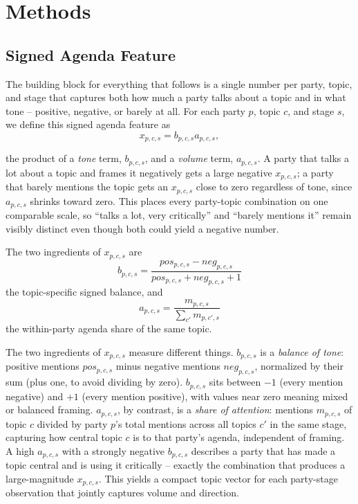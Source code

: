 \documentclass[conference]{IEEEtran}
\begin{document}
\FloatBarrier

\smallskip
\section{Methods}
\subsection{Signed Agenda Feature}
The building block for everything that follows is a single number per party, topic, and stage that captures both how much a party talks about a topic and in what tone -- positive, negative, or barely at all. For each party $p$, topic $c$, and stage $s$, we define this signed agenda feature as
\begin{equation}
x_{p,c,s} = b_{p,c,s} a_{p,c,s},
\end{equation}

the product of a \emph{tone} term, $b_{p,c,s}$, and a \emph{volume} term, $a_{p,c,s}$. A party that talks a lot about a topic and frames it negatively gets a large negative $x_{p,c,s}$; a party that barely mentions the topic gets an $x_{p,c,s}$ close to zero regardless of tone, since $a_{p,c,s}$ shrinks toward zero. This places every party-topic combination on one comparable scale, so ``talks a lot, very critically'' and ``barely mentions it'' remain visibly distinct even though both could yield a negative number.

The two ingredients of $x_{p,c,s}$ are
\begin{equation}
b_{p,c,s} =
\frac{pos_{p,c,s}-neg_{p,c,s}}{pos_{p,c,s}+neg_{p,c,s}+1}
\end{equation}
the topic-specific signed balance, and
\begin{equation}
a_{p,c,s} =
\frac{m_{p,c,s}}{\sum_{c'} m_{p,c',s}}
\end{equation}
the within-party agenda share of the same topic.

The two ingredients of $x_{p,c,s}$ measure different things. $b_{p,c,s}$ is a \emph{balance of tone}: positive mentions $pos_{p,c,s}$ minus negative mentions $neg_{p,c,s}$, normalized by their sum (plus one, to avoid dividing by zero). $b_{p,c,s}$ sits between $-1$ (every mention negative) and $+1$ (every mention positive), with values near zero meaning mixed or balanced framing. $a_{p,c,s}$, by contrast, is a \emph{share of attention}: mentions $m_{p,c,s}$ of topic $c$ divided by party $p$'s total mentions across all topics $c'$ in the same stage, capturing how central topic $c$ is to that party's agenda, independent of framing. A high $a_{p,c,s}$ with a strongly negative $b_{p,c,s}$ describes a party that has made a topic central and is using it critically -- exactly the combination that produces a large-magnitude $x_{p,c,s}$. This yields a compact topic vector for each party-stage observation that jointly captures volume and direction.
\end{document}
